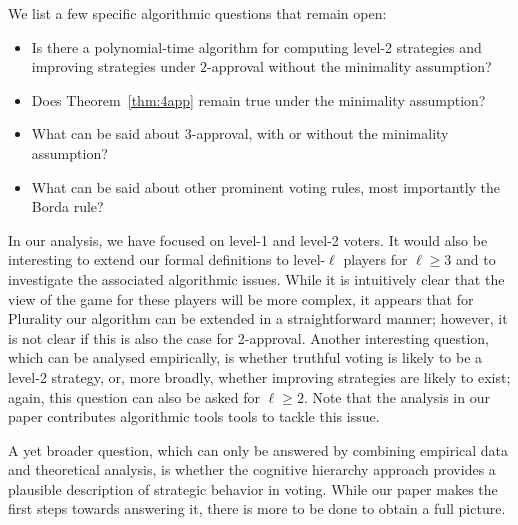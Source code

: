 \documentclass[11pt]{article}
\begin{document}
We list a few specific algorithmic questions that remain open:
\begin{itemize}
\item Is there a polynomial-time algorithm for computing level-2 strategies and improving strategies under $2$-approval 
without the minimality assumption?
\item Does Theorem~\ref{thm:4app} remain true under the minimality assumption?
\item What can be said about $3$-approval, with or without the minimality assumption?
\item What can be said about other prominent voting rules, most importantly the Borda rule?
\end{itemize}

In our analysis, we have focused on level-1 and level-2 voters. It would also be interesting
to extend our formal definitions to level-$\ell$ players for $\ell\ge 3$ and 
to investigate the associated algorithmic issues. 
While it is intuitively clear that the view of the game for these players will be more complex, it appears that for Plurality our algorithm can be extended in a straightforward manner; 
however, it is not clear if this is also the case for 2-approval.
Another interesting question, which can be analysed empirically, is whether truthful voting is likely to be a level-2 strategy,
or, more broadly, whether improving strategies are likely to exist; again, this question
can also be asked for $\ell\ge 2$. Note that the analysis in our paper contributes algorithmic tools
tools to tackle this issue.

A yet broader question, which can only be answered by combining empirical data and theoretical analysis,  
is whether the cognitive hierarchy approach provides a plausible
description of strategic behavior in voting. While our paper makes the first steps towards answering it, 
there is more to be done to obtain a full picture.




\end{document}
